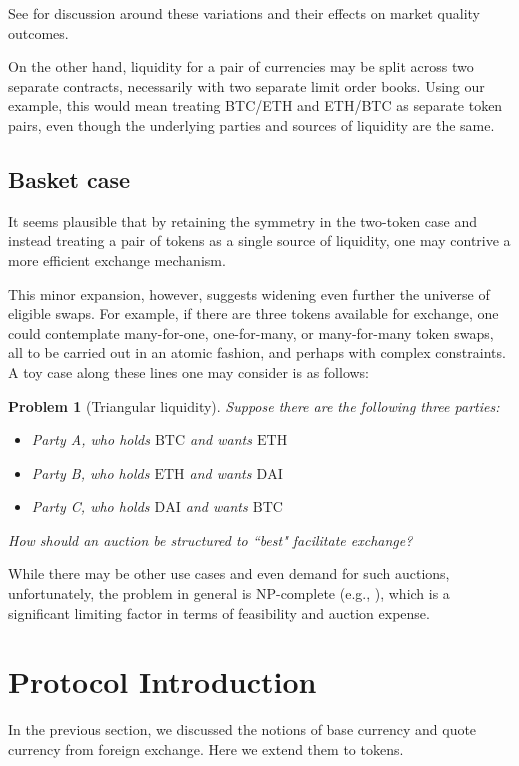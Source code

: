 \documentclass[11pt, reqno]{amsart}
\newtheorem{problem}[thm]{Problem}
\newcommand{\BTC}{\mathrm{BTC}}
\newcommand{\ETH}{\mathrm{ETH}}
\newcommand{\DAI}{\mathrm{DAI}}
\begin{document}
See \cite{BeLaLiVa22} for discussion around these variations and their effects
on market quality outcomes.

On the other hand, liquidity for a pair of currencies may be split across two
separate contracts, necessarily with two separate limit order books. Using our
example, this would mean treating BTC/ETH and ETH/BTC as separate token pairs,
even though the underlying parties and sources of liquidity are the same.

\subsection{Basket case}

It seems plausible that by retaining the symmetry in the two-token case and
instead treating a pair of tokens as a single source of liquidity, one may
contrive a more efficient exchange mechanism.

This minor expansion, however, suggests widening even further the universe of
eligible swaps. For example, if there are three tokens available for exchange,
one could contemplate many-for-one, one-for-many, or many-for-many token swaps,
all to be carried out in an atomic fashion, and perhaps with complex
constraints. A toy case along these lines one may consider is as follows:
\begin{problem}[Triangular liquidity]
Suppose there are the following three parties:
\begin{itemize}
    \item Party A, who holds $\BTC$ and wants $\ETH$
    \item Party B, who holds $\ETH$ and wants $\DAI$
    \item Party C, who holds $\DAI$ and wants $\BTC$
\end{itemize}
How should an auction be structured to ``best" facilitate exchange?
\end{problem}
While there may be other use cases and even demand for such auctions,
unfortunately, the problem in general is NP-complete (e.g., \cite{XiStWh05}),
which is a significant limiting factor in terms of feasibility and
auction expense.

\section{Protocol Introduction}

In the previous section, we discussed the notions of base currency and
quote currency from foreign exchange. Here we extend them to tokens.
\end{document}
